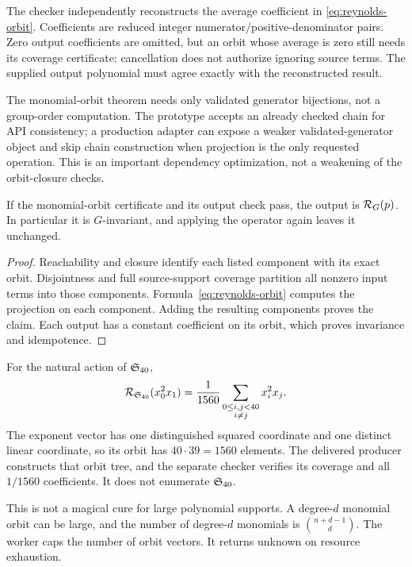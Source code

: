 The checker independently reconstructs the average coefficient in \eqref{eq:reynolds-orbit}. Coefficients are reduced integer numerator/positive-denominator pairs. Zero output coefficients are omitted, but an orbit whose average is zero still needs its coverage certificate: cancellation does not authorize ignoring source terms. The supplied output polynomial must agree exactly with the reconstructed result.

The monomial-orbit theorem needs only validated generator bijections, not a group-order computation. The prototype accepts an already checked chain for API consistency; a production adapter can expose a weaker validated-generator object and skip chain construction when projection is the only requested operation. This is an important dependency optimization, not a weakening of the orbit-closure checks.

\begin{theorem}
If the monomial-orbit certificate and its output check pass, the output is $\mathcal R_G(p)$. In particular it is $G$-invariant, and applying the operator again leaves it unchanged.
\end{theorem}
\begin{proof}
Reachability and closure identify each listed component with its exact orbit. Disjointness and full source-support coverage partition all nonzero input terms into those components. Formula~\eqref{eq:reynolds-orbit} computes the projection on each component. Adding the resulting components proves the claim. Each output has a constant coefficient on its orbit, which proves invariance and idempotence.
\end{proof}

\begin{example}
For the natural action of $\mathfrak S_{40}$,
\[
 \mathcal R_{\mathfrak S_{40}}(x_0^2x_1)
   =\frac1{1560}\sum_{\substack{0\leq i,j<40\\i\ne j}}x_i^2x_j.
\]
The exponent vector has one distinguished squared coordinate and one distinct linear coordinate, so its orbit has $40\cdot39=1560$ elements. The delivered producer constructs that orbit tree, and the separate checker verifies its coverage and all $1/1560$ coefficients. It does not enumerate $\mathfrak S_{40}$.
\end{example}

This is not a magical cure for large polynomial supports. A degree-$d$ monomial orbit can be large, and the number of degree-$d$ monomials is $\binom{n+d-1}{d}$. The worker caps the number of orbit vectors. It returns unknown on resource exhaustion.

